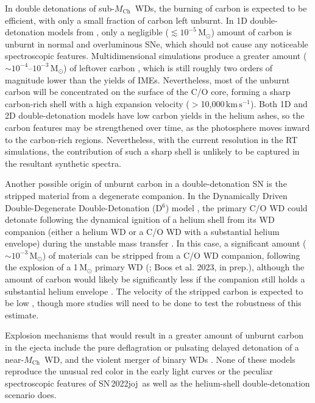 \documentclass[twocolumn]{aastex631}
\newcommand{\sn}{SN\,2022joj}
\newcommand{\Mch}{$M_\mathrm{Ch}$}
\newcommand{\kms}{$\mathrm{km}\,\mathrm{s}^{-1}$}
\begin{document}
\begin{CJK*}{UTF8}{gbsn}
In double detonations of sub-\Mch\ WDs, the burning of carbon is expected to be efficient, with only a small fraction of carbon left unburnt. In 1D double-detonation models from \citet{polin_observational_2019}, only a negligible ($\lesssim$$10^{-5}\,\mathrm{M_\odot}$) amount of carbon is unburnt in normal and overluminous SNe, which should not cause any noticeable spectroscopic features. Multidimensional simulations produce a greater amount ($\sim$$10^{-4}$--$10^{-3}$\,$\mathrm{M_\odot}$) of leftover carbon \citep{Fink_DD_2010,Boos_2021}, which is still roughly two orders of magnitude lower than the yields of IMEs. Nevertheless, most of the unburnt carbon will be concentrated on the surface of the C/O core, forming a sharp carbon-rich shell \citep[see Figures~5--8 in][]{Boos_2021} with a high expansion velocity ($>$10,000\,\kms). Both 1D and 2D double-detonation models have low carbon yields in the helium ashes, so the carbon features may be strengthened over time, as the photosphere moves inward to the carbon-rich regions. Nevertheless, with the current resolution in the RT simulations, the contribution of such a sharp shell is unlikely to be captured in the resultant synthetic spectra. 

Another possible origin of unburnt carbon in a double-detonation SN is the stripped material from a degenerate companion. In the Dynamically Driven Double-Degenerate Double-Detonation (D$^6$) model \citep{Shen_2018}, the primary C/O WD could detonate following the dynamical ignition of a helium shell from its WD companion (either a helium WD or a C/O WD with a substantial helium envelope) during the unstable mass transfer \citep{Guillochon_2010,Pakmor_2013}. In this case, a significant amount ($\sim$$10^{-3}\,\mathrm{M_\odot}$) of materials can be stripped from a C/O WD companion, following the explosion of a 1\,$\mathrm{M_\odot}$ primary WD (\citealp{Tanikawa_2018}; Boos et al. 2023, in prep.), although the amount of carbon would likely be significantly less if the companion still holds a substantial helium envelope \citep{Tanikawa_2019}. The velocity of the stripped carbon is expected to be low \citep[e.g., centered at $\sim$3000\,\kms\ in][]{Tanikawa_2018}, though more studies will need to be done to test the robustness of this estimate.

Explosion mechanisms that would result in a greater amount of unburnt carbon in the ejecta include the pure deflagration \citep{Nomoto_1984b} or pulsating delayed detonation \citep{Hoeflich_1995,Dessart_2014} of a near-\Mch\ WD, and the violent merger of binary WDs \citep{Raskin_2014}. None of these models  reproduce the unusual red color in the early light curves or the peculiar spectroscopic features of \sn\ as well as the helium-shell double-detonation scenario does. %


\end{CJK*}
\end{document}
